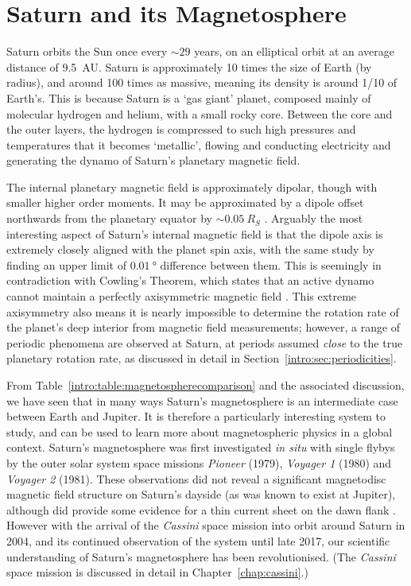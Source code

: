 \section{Saturn and its Magnetosphere}\label{intro:sec:saturn}
Saturn orbits the Sun once every ${\sim}29$ years, on an elliptical orbit at an average distance of \SI{9.5}{AU}. Saturn is approximately 10 times the size of Earth (by radius), and around 100 times as massive, meaning its density is around 1/10 of Earth's. This is because Saturn is a `gas giant' planet, composed mainly of molecular hydrogen and helium, with a small rocky core. Between the core and the outer layers, the hydrogen is compressed to such high pressures and temperatures that it becomes `metallic', flowing and conducting electricity and generating the dynamo of Saturn's planetary magnetic field.

The internal planetary magnetic field is approximately dipolar, though with smaller higher order moments. It may be approximated by a dipole offset northwards from the planetary equator by ${\sim}\SI{0.05}{R_S}$ \citep{dougherty2018}. Arguably the most interesting aspect of Saturn's internal magnetic field is that the dipole axis is extremely closely aligned with the planet spin axis, with the same study by \citet{dougherty2018} finding an upper limit of $\SI{0.01}{\degree}$ difference between them. This is seemingly in contradiction with Cowling's Theorem, which states that an active dynamo cannot maintain a perfectly axisymmetric magnetic field \citep{cowling1933}. This extreme axisymmetry also means it is nearly impossible to determine the rotation rate of the planet's deep interior from magnetic field measurements; however, a range of periodic phenomena are observed at Saturn, at periods assumed \textit{close} to the true planetary rotation rate, as discussed in detail in Section~\ref{intro:sec:periodicities}.

From Table~\ref{intro:table:magnetospherecomparison} and the associated discussion, we have seen that in many ways Saturn's magnetosphere is an intermediate case between Earth and Jupiter. It is therefore a particularly interesting system to study, and can be used to learn more about magnetospheric physics in a global context. Saturn's magnetosphere was first investigated \textit{in situ} with single flybys by the outer solar system space missions \textit{Pioneer} (1979), \textit{Voyager 1} (1980) and \textit{Voyager 2} (1981). These observations did not reveal a significant magnetodisc magnetic field structure on Saturn's dayside (as was known to exist at Jupiter), although did provide some evidence for a thin current sheet on the dawn flank \citep{smith1980}. However with the arrival of the \textit{Cassini} space mission into orbit around Saturn in 2004, and its continued observation of the system until late 2017, our scientific understanding of Saturn's magnetosphere has been revolutionised. (The \textit{Cassini} space mission is discussed in detail in Chapter~\ref{chap:cassini}.)


